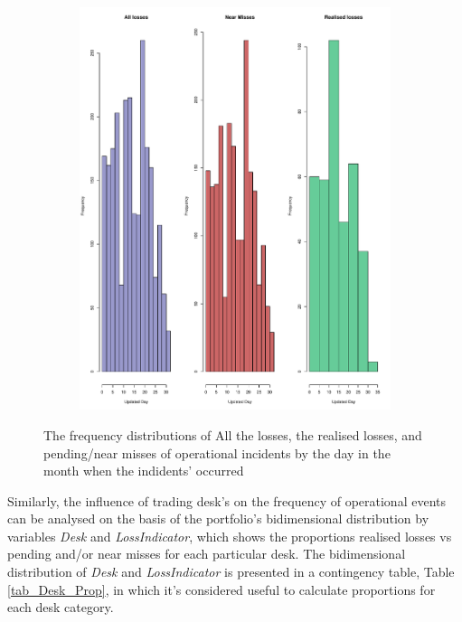 \documentclass{DissertateUSU}
\begin{document}
\begin{figure}
\begin{subfigure}[b]{0.5\textwidth}
   \includegraphics[width=\linewidth]{Exploratory_UpdateDay_Frequency3plot.pdf}
   \label{Exploratory_UpdateDay_Frequency3plot}
\end{subfigure}

\caption[Two numerical solutions: Histograms showing the distribution of UpdatedTime \& UpdatedDay by LossIndicator.]{The frequency distributions of All the losses, the realised losses, and pending/near misses of operational incidents by the day in the month when the indidents' occurred}
\label{Exploratory_Time_Day_Frequency3plot}
\end{figure}

Similarly, the influence of trading desk's on the frequency of
operational events can be analysed on the basis of the portfolio's
bidimensional distribution by variables \emph{Desk} and
\emph{LossIndicator}, which shows the proportions realised losses vs
pending and/or near misses for each particular desk. The bidimensional
distribution of \emph{Desk} and \emph{LossIndicator} is presented in a
contingency table, Table \ref{tab_Desk_Prop}, in which it's considered
useful to calculate proportions for each desk category.
\end{document}
